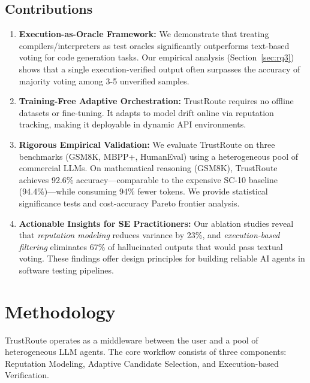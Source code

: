 \documentclass[acmsmall,screen,review,anonymous]{acmart}
\begin{document}
\subsection{Contributions}
\begin{enumerate}
    \item \textbf{Execution-as-Oracle Framework:} We demonstrate that treating compilers/interpreters as test oracles significantly outperforms text-based voting for code generation tasks. Our empirical analysis (Section~\ref{sec:rq3}) shows that a single execution-verified output often surpasses the accuracy of majority voting among 3-5 unverified samples.
    
    \item \textbf{Training-Free Adaptive Orchestration:} TrustRoute requires no offline datasets or fine-tuning. It adapts to model drift online via reputation tracking, making it deployable in dynamic API environments.
    
    \item \textbf{Rigorous Empirical Validation:} We evaluate TrustRoute on three benchmarks (GSM8K, MBPP+, HumanEval) using a heterogeneous pool of commercial LLMs. On mathematical reasoning (GSM8K), TrustRoute achieves 92.6\% accuracy—comparable to the expensive SC-10 baseline (94.4\%)—while consuming 94\% fewer tokens. We provide statistical significance tests and cost-accuracy Pareto frontier analysis.
    
    \item \textbf{Actionable Insights for SE Practitioners:} Our ablation studies reveal that \textit{reputation modeling} reduces variance by 23\%, and \textit{execution-based filtering} eliminates 67\% of hallucinated outputs that would pass textual voting. These findings offer design principles for building reliable AI agents in software testing pipelines.
\end{enumerate}

\section{Methodology}

TrustRoute operates as a middleware between the user and a pool of heterogeneous LLM agents. The core workflow consists of three components: Reputation Modeling, Adaptive Candidate Selection, and Execution-based Verification.
\end{document}
